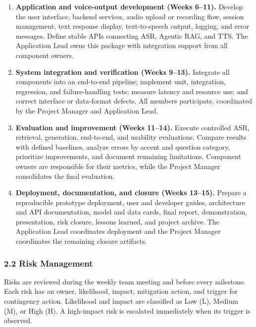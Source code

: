 \documentclass[11pt,a4paper]{article}
\begin{document}
\begin{enumerate}
  \item \textbf{Application and voice-output development (Weeks 6--11).}
  Develop the user interface, backend services, audio upload or recording flow,
  session management, text response display, text-to-speech output, logging,
  and error messages. Define stable APIs connecting ASR, Agentic RAG, and TTS.
  The Application Lead owns this package with integration support from all
  component owners.

  \item \textbf{System integration and verification (Weeks 9--13).}
  Integrate all components into an end-to-end pipeline; implement unit,
  integration, regression, and failure-handling tests; measure latency and
  resource use; and correct interface or data-format defects. All members
  participate, coordinated by the Project Manager and Application Lead.

  \item \textbf{Evaluation and improvement (Weeks 11--14).}
  Execute controlled ASR, retrieval, generation, end-to-end, and usability
  evaluations. Compare results with defined baselines, analyze errors by
  accent and question category, prioritize improvements, and document remaining
  limitations. Component owners are responsible for their metrics, while the
  Project Manager consolidates the final evaluation.

  \item \textbf{Deployment, documentation, and closure (Weeks 13--15).}
  Prepare a reproducible prototype deployment, user and developer guides,
  architecture and API documentation, model and data cards, final report,
  demonstration, presentation, risk closure, lessons learned, and project
  archive. The Application Lead coordinates deployment and the Project Manager
  coordinates the remaining closure artifacts.
\end{enumerate}

\subsubsection{2.2 Risk Management}

Risks are reviewed during the weekly team meeting and before every milestone.
Each risk has an owner, likelihood, impact, mitigation action, and trigger for
contingency action. Likelihood and impact are classified as Low (L), Medium
(M), or High (H). A high-impact risk is escalated immediately when its trigger
is observed.
\end{document}
